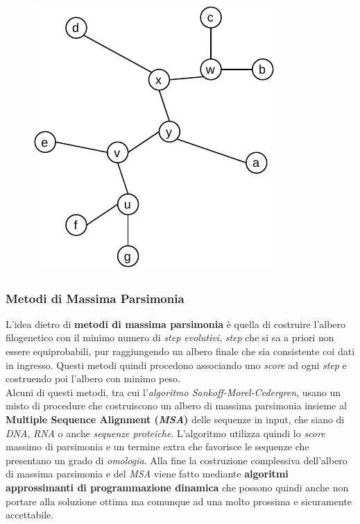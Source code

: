 \documentclass[a4paper,12pt, oneside]{book}
\begin{document}
\begin{figure}[H]
  \centering
  \includegraphics[scale = 0.8]{img/nj3.pdf}
\end{figure}
\subsubsection{Metodi di Massima Parsimonia}
L'idea dietro di \textbf{metodi di massima parsimonia} è quella di costruire
l'albero filogenetico con il minimo numero di \textit{step evolutivi},
\textit{step} che si sa a priori non essere equiprobabili, pur
raggiungendo un albero finale che sia consistente coi dati in ingresso.
Questi metodi quindi procedono associando uno \textit{score} ad ogni
\textit{step} e costruendo poi l'albero con minimo peso.\\
Alcuni di questi metodi, tra cui l'\textit{algoritmo Sankoff-Morel-Cedergren},
usano un misto di procedure che costruiscono un albero di massima parsimonia
insieme al \textbf{Multiple Sequence Alignment (\textit{MSA})} delle sequenze in
input, che siano di \textit{DNA}, \textit{RNA} o anche \textit{sequenze
  proteiche}. L'algoritmo utilizza quindi lo \textit{score} massimo di
parsimonia e un termine extra che favorisce le sequenze che presentano un grado
di \textit{omologia}. Alla fine la costruzione complessiva dell'albero di
massima parsimonia e del \textit{MSA} viene fatto mediante \textbf{algoritmi
approssimanti di programmazione dinamica} che possono quindi anche non portare
alla soluzione ottima ma comunque ad una molto prossima e sicuramente
accettabile. 
\end{document}
